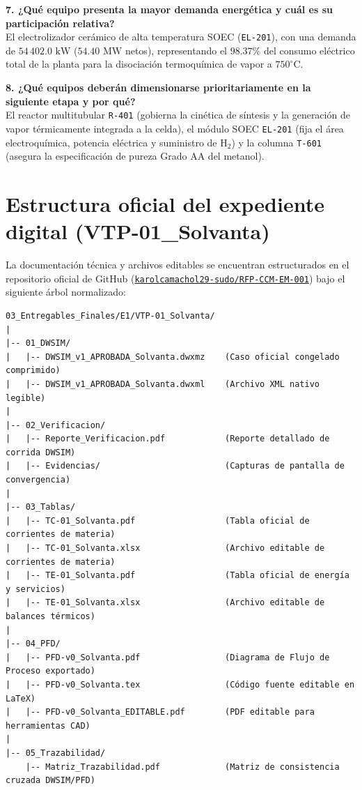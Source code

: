 \documentclass[11pt,letterpaper]{article}
\begin{document}
\textbf{7. ¿Qué equipo presenta la mayor demanda energética y cuál es su participación relativa?}\\
El electrolizador cerámico de alta temperatura SOEC (\texttt{EL-201}), con una demanda de $54\,402.0\text{ kW}$ ($54.40\text{ MW}$ netos), representando el $\mathbf{98.37\%}$ del consumo eléctrico total de la planta para la disociación termoquímica de vapor a $750^\circ\text{C}$.

\textbf{8. ¿Qué equipos deberán dimensionarse prioritariamente en la siguiente etapa y por qué?}\\
El reactor multitubular \texttt{R-401} (gobierna la cinética de síntesis y la generación de vapor térmicamente integrada a la celda), el módulo SOEC \texttt{EL-201} (fija el área electroquímica, potencia eléctrica y suministro de $\text{H}_2$) y la columna \texttt{T-601} (asegura la especificación de pureza Grado AA del metanol).

\clearpage

\section{Estructura oficial del expediente digital (VTP-01\_Solvanta)}

La documentación técnica y archivos editables se encuentran estructurados en el repositorio oficial de GitHub (\href{https://github.com/karolcamachol29-sudo/RFP-CCM-EM-001}{\texttt{karolcamachol29-sudo/RFP-CCM-EM-001}}) bajo el siguiente árbol normalizado:

{\small
\begin{verbatim}
03_Entregables_Finales/E1/VTP-01_Solvanta/
|
|-- 01_DWSIM/
|   |-- DWSIM_v1_APROBADA_Solvanta.dwxmz    (Caso oficial congelado comprimido)
|   |-- DWSIM_v1_APROBADA_Solvanta.dwxml    (Archivo XML nativo legible)
|
|-- 02_Verificacion/
|   |-- Reporte_Verificacion.pdf            (Reporte detallado de corrida DWSIM)
|   |-- Evidencias/                         (Capturas de pantalla de convergencia)
|
|-- 03_Tablas/
|   |-- TC-01_Solvanta.pdf                  (Tabla oficial de corrientes de materia)
|   |-- TC-01_Solvanta.xlsx                 (Archivo editable de corrientes de materia)
|   |-- TE-01_Solvanta.pdf                  (Tabla oficial de energía y servicios)
|   |-- TE-01_Solvanta.xlsx                 (Archivo editable de balances térmicos)
|
|-- 04_PFD/
|   |-- PFD-v0_Solvanta.pdf                 (Diagrama de Flujo de Proceso exportado)
|   |-- PFD-v0_Solvanta.tex                 (Código fuente editable en LaTeX)
|   |-- PFD-v0_Solvanta_EDITABLE.pdf        (PDF editable para herramientas CAD)
|
|-- 05_Trazabilidad/
    |-- Matriz_Trazabilidad.pdf             (Matriz de consistencia cruzada DWSIM/PFD)
\end{verbatim}
}
\end{document}
